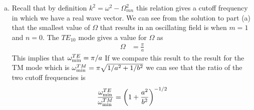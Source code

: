\documentclass[11pt]{article}
\numberwithin{equation}{section}
\begin{document}
\begin{enumerate}[(a)]
\item
    Recall that by definition $k^2 = \omega^2-\Omega^2_{mn}$ this relation gives a cutoff frequency in which we have
    a real wave vector. We can see from the solution to part (a) that the smallest value of $\Omega$ that results in
    an oscillating field is when $m=1$ and $n=0$. The $TE_{10}$ mode gives a value for $\Omega$ as
    \begin{align*}
        \Omega &= \frac{\pi}{a}
    \end{align*}
    This implies that $\omega_{\textnormal{min}}^{TE} = \pi/a$
    If we compare this result to the result for the TM mode which is 
    $\omega_{\textnormal{min}}^{TM} = \pi\sqrt{1/a^2+1/b^2}$
    we can see that the ratio of the two cutoff frequencies is
    $$\frac{\omega_{\textnormal{min}}^{TE}}{\omega_{\textnormal{min}}^{TM}} = \left(1+\frac{a^2}{b^2}\right)^{-1/2}$$
\end{enumerate}
\end{document}
